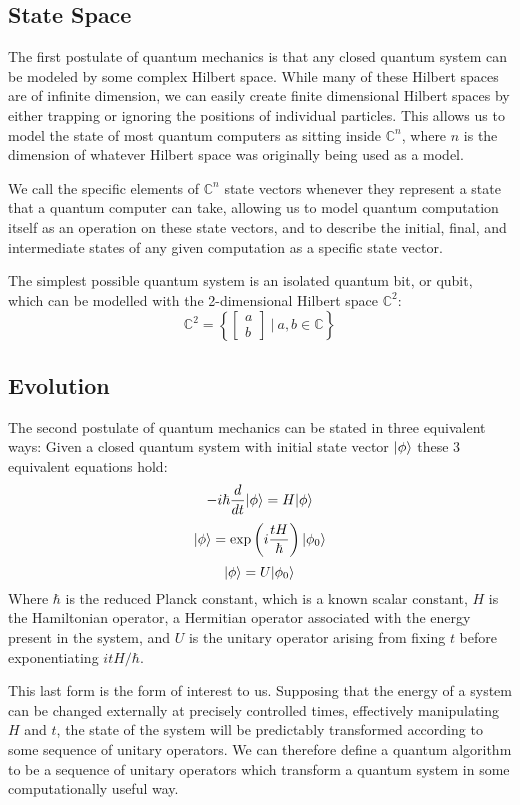 \subsection{State Space}
The first postulate of quantum mechanics is that any closed quantum system can be modeled by some complex Hilbert space. While many of these Hilbert spaces are of infinite dimension, we can easily create finite dimensional Hilbert spaces by either trapping or ignoring the positions of individual particles. This allows us to model the state of most quantum computers as sitting inside $\mathbb{C}^n$, where $n$ is the dimension of whatever Hilbert space was originally being used as a model.

We call the specific elements of $\mathbb{C}^n$ state vectors whenever they represent a state that a quantum computer can take, allowing us to model quantum computation itself as an operation on these state vectors, and to describe the initial, final, and intermediate states of any given computation as a specific state vector.

The simplest possible quantum system is an isolated quantum bit, or qubit, which can be modelled with the 2-dimensional Hilbert space $\mathbb{C}^2$:
\[
\mathbb{C}^2 = \left\{\left[\begin{matrix}
a\\
b
\end{matrix}\right]\ \bigg|\ a, b \in \mathbb{C}\right\}
\]
\subsection{Evolution}
The second postulate of quantum mechanics can be stated in three equivalent ways: Given a closed quantum system with initial state vector $| \phi \rangle$ these 3 equivalent equations hold:
\[-i\hbar\frac{d}{dt}| \phi \rangle = H| \phi \rangle\]
\[| \phi \rangle = \exp\left(i \frac{tH}{\hbar}\right)| \phi_0 \rangle\]
\[| \phi \rangle = U| \phi_0 \rangle\]
Where $\hbar$ is the reduced Planck constant, which is a known scalar constant, $H$ is the Hamiltonian operator, a Hermitian operator associated with the energy present in the system, and $U$ is the unitary operator arising from fixing $t$ before exponentiating $itH/\hbar$.

This last form is the form of interest to us. Supposing that the energy of a system can be changed externally at precisely controlled times, effectively manipulating $H$ and $t$, the state of the system will be predictably transformed according to some sequence of unitary operators. We can therefore define a quantum algorithm to be a sequence of unitary operators which transform a quantum system in some computationally useful way.
